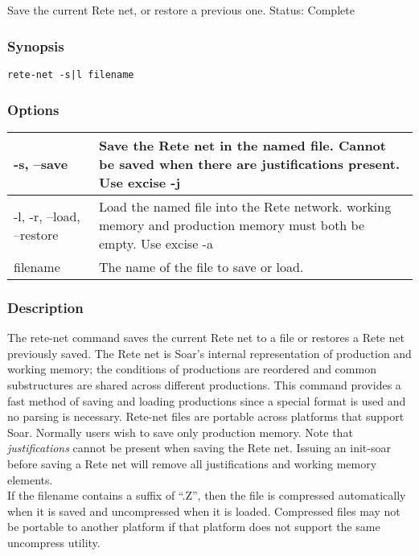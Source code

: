 \subsection{}
\label{rete-net}
Save the current Rete net, or restore a previous one. 
 Status: Complete
\subsubsection*{Synopsis}
\begin{verbatim}
rete-net -s|l filename
\end{verbatim}
\subsubsection*{Options}
\begin{tabular}{|l|l|}
\hline 
 -s, --save  & Save the Rete net in the named file. Cannot be saved when there are justifications present. Use excise -j \\
 \hline 
 -l, -r, --load, --restore  & Load the named file into the Rete network. working memory and production memory must both be empty. Use excise -a \\
 \hline 
filename & The name of the file to save or load.  \\
 \hline 
\end{tabular}
\subsubsection*{Description}
 The rete-net command saves the current Rete net to a file or restores a Rete net previously saved. The Rete net is Soar's internal representation of production and working memory; the conditions of productions are reordered and common substructures are shared across different productions. This command provides a fast method of saving and loading productions since a special format is used and no parsing is necessary. Rete-net files are portable across platforms that support Soar. 
  Normally users wish to save only production memory. Note that \emph{justifications}
 cannot be present when saving the Rete net. Issuing an init-soar before saving a Rete net will remove all justifications and working memory elements. \\ 
 If the filename contains a suffix of ``.Z'', then the file is compressed automatically when it is saved and uncompressed when it is loaded. Compressed files may not be portable to another platform if that platform does not support the same uncompress utility. 
